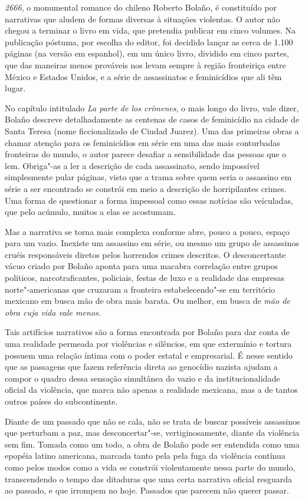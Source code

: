 \asterisc

\emph{2666}, o monumental romance do chileno Roberto Bolaño, é
constituído por narrativas que aludem de formas diversas à situações
violentas. O autor não chegou a terminar o livro em vida, que pretendia
publicar em cinco volumes. Na publicação póstuma, por escolha do editor,
foi decidido lançar as cerca de 1.100 páginas (na versão em espanhol),
em um único livro, dividido em cinco partes, que das maneiras menos
prováveis nos levam sempre à região fronteiriça entre México e Estados
Unidos, e a série de assassinatos e feminicídios que ali têm lugar.

No capítulo intitulado \emph{La parte de los crímenes}, o mais longo do
livro, vale dizer, Bolaño descreve detalhadamente as centenas de casos
de feminicídio na cidade de Santa Teresa (nome ficcionalizado de Ciudad
Juarez). Uma das primeiras obras a chamar atenção para os feminicídios
em série em uma das mais conturbadas fronteiras do mundo, o autor parece
desafiar a sensibilidade das pessoas que o lem. Obriga"-as a ler a
descrição de cada assassinato, sendo impossível simplesmente pular
páginas, visto que a trama sobre quem seria o assassino em série a ser
encontrado se constrói em meio a descrição de horripilantes crimes. Uma
forma de questionar a forma impessoal como essas notícias são
veículadas, que pelo acúmulo, muitos a elas se acostumam.

Mas a narrativa se torna mais complexa conforme abre, pouco a pouco,
espaço para um vazio. Inexiste um assassino em série, ou mesmo um grupo
de assassinos cruéis responsáveis diretos pelos horrendos crimes
descritos. O desconcertante vácuo criado por Bolaño aponta para uma
macabra correlação entre grupos políticos, narcotraficantes, policiais,
festas de luxo e a realidade das empresas norte"-americanas que cruzaram
a fronteira estabelecendo"-se em território mexicano em busca mão de obra
mais barata. Ou melhor, em busca de \emph{mão de obra cuja vida vale
menos}.

Tais artifícios narrativos são a forma encontrada por Bolaño para dar
conta de uma realidade permeada por violências e silêncios, em que
extermínio e tortura possuem uma relação íntima com o poder estatal e
empresarial. É nesse sentido que as passagens que fazem referência
direta ao genocídio nazista ajudam a compor o quadro dessa sensação
simultânea do vazio e da institucionalidade oficial da violência, que
marca não apenas a realidade mexicana, mas a de tantos outros países do
subcontinente.

Diante de um passado que não se cala, não se trata de buscar possíveis
assassinos que perturbam a paz, mas desconcertar"-se, vertiginosamente,
diante da violência sem fim. Tomada como um todo, a obra de Bolaño pode
ser entendida como uma epopéia latino americana, marcada tanto pela pela
fuga da violência contínua como pelos modos como a vida se constrói
violentamente nessa parte do mundo, transcendendo o tempo das ditaduras
que uma certa narrativa oficial resguarda ao passado, e que irrompem no
hoje. Passados que parecem não querer passar.

